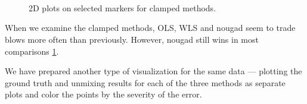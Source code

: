 \begin{figure}
  \centering
  \\
  \\
  \\
  \caption{2D plots on selected markers for clamped methods.}
  \label{fig:bld_cl}
\end{figure}

When we examine the clamped methods, OLS, WLS and nougad seem to trade blows more often than previously. However, nougad still wins in most comparisons \cref{fig:bld_cl}.

We have prepared another type of visualization for the same data --- plotting the ground truth and unmixing results for each of the three methods as separate plots and color the points by the severity of the error.

